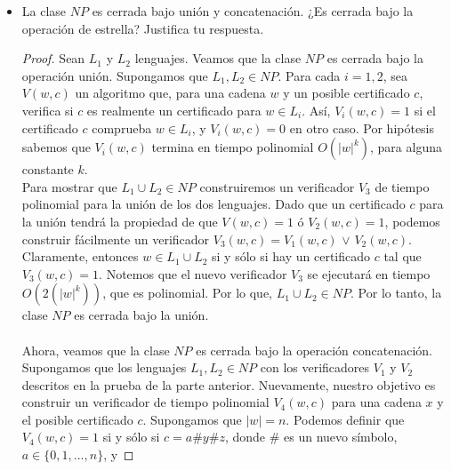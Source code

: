 \documentclass[letterpaper,10pt]{article}
\begin{document}
\begin{enumerate}
\begin{itemize}
\begin{proof}
            La Máquina de Turing $S_2$ sólo genera lo contrario de lo que hace
            $S_1$, por lo que $S_2$ decide $L_1^{c}$. Por lo que, debido a que
            $S_1$ corre en tiempo polinomial, entonces el tiempo de ejecución
            de $S_2$ también es polinomial. Por lo tanto, la clase $P$ es 
            cerrada bajo la operación complemento. 
            
         \end{proof}

         
         \item La clase $NP$ es cerrada bajo unión y concatenación. ¿Es cerrada
         bajo la operación de estrella? Justifica tu respuesta.
         
         \begin{proof}
             Sean $L_1$ y $L_2$ lenguajes. Veamos que la clase $NP$ es cerrada 
             bajo la operación unión. Supongamos que $L_1, L_2 \in NP$. Para 
             cada $i = 1, 2$, sea $V(w, c)$ un algoritmo que, para una cadena
             $w$ y un posible certificado $c$, verifica si $c$ es realmente un 
             certificado para $w \in L_i$.  Así, $V_i(w, c) = 1$ si el 
             certificado $c$ comprueba $w \in L_i$, y $V_i(w, c) = 0$ en otro
             caso.  Por hipótesis  sabemos que $V_i(w, c)$ termina en tiempo
             polinomial $O(|w|^{k})$, para alguna constante $k$. \\
             Para mostrar que $L_1 \cup L_2 \in NP$ construiremos un 
             verificador $V_3$ de tiempo polinomial para la unión de los dos
             lenguajes. Dado que un certificado $c$ para la unión tendrá la 
             propiedad de que $V(w, c) = 1 $ ó $V_2(w, c) = 1$, podemos 
             construir fácilmente un verificador $V_3(w, c) = V_1(w, c) $ 
             $\vee$ $V_2(w, c)$. Claramente, entonces $w \in L_1 \cup L_2$
             si y sólo si hay un certificado $c$ tal que $V_3(w, c) = 1$.
             Notemos que el nuevo verificador $V_3$ se ejecutará en tiempo
             $O(2(|w|^{k}))$, que es polinomial. Por lo que, 
              $L_1 \cup L_2 \in NP$. Por lo tanto, la clase $NP$ es cerrada bajo
              la unión.  \\ \\
              Ahora, veamos que la clase $NP$ es cerrada bajo la operación
              concatenación.  Supongamos que los lenguajes  $L_1, L_2 \in NP$
              con los verificadores $V_1$ y $V_2$ descritos en la prueba de la
              parte anterior. Nuevamente, nuestro objetivo es construir un 
              verificador de tiempo polinomial $V_4(w, c)$ para una cadena $x$
              y el posible certificado $c$. Supongamos que $|w| = n$. Podemos
              definir que $V_4(w, c) = 1$ si y sólo si $c = a\# y \# z$, donde
              $\#$ es un nuevo símbolo, $a \in \{0, 1, ..., n\}$, y
              

\end{proof}
\end{itemize}
\end{enumerate}
\end{document}
